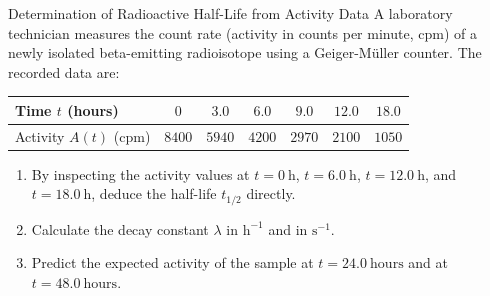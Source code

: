 \begin{exercise}{Determination of Radioactive Half-Life from Activity Data}
A laboratory technician measures the count rate (activity in counts per minute, $\mathrm{cpm}$) of a newly isolated beta-emitting radioisotope using a Geiger-Müller counter. The recorded data are:
\begin{center}
\begin{tabular}{lcccccc}
\toprule
Time $t$ (hours) & $0$ & $3.0$ & $6.0$ & $9.0$ & $12.0$ & $18.0$ \\
\midrule
Activity $A(t)$ ($\mathrm{cpm}$) & $8400$ & $5940$ & $4200$ & $2970$ & $2100$ & $1050$ \\
\bottomrule
\end{tabular}
\end{center}
\begin{enumerate}[leftmargin=1.5em,itemsep=2pt]
  \item By inspecting the activity values at $t = 0\ \mathrm{h}$, $t = 6.0\ \mathrm{h}$, $t = 12.0\ \mathrm{h}$, and $t = 18.0\ \mathrm{h}$, deduce the half-life $t_{1/2}$ directly.
  \item Calculate the decay constant $\lambda$ in $\mathrm{h^{-1}}$ and in $\mathrm{s^{-1}}$.
  \item Predict the expected activity of the sample at $t = 24.0\ \mathrm{hours}$ and at $t = 48.0\ \mathrm{hours}$.
\end{enumerate}
\end{exercise}

\begin{tabletworkspace}[5.0cm]
\end{tabletworkspace}


